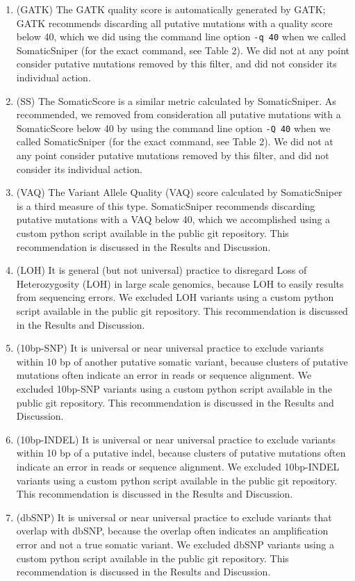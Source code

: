 \documentclass[11pt]{article} %
\begin{document}
\begin{enumerate}
\item (GATK) The GATK quality score is automatically generated by GATK; GATK recommends discarding all putative mutations with a quality score below 40, which we did using the command line option \texttt{-q 40} when we called SomaticSniper (for the exact command, see Table 2). We did not at any point consider putative mutations removed by this filter, and did not consider its individual action. 
\item (SS) The SomaticScore is a similar metric calculated by SomaticSniper. As recommended, we removed from consideration all putative mutations with a SomaticScore below 40 by using the command line option \texttt{-Q 40} when we called SomaticSniper (for the exact command, see Table 2). We did not at any point consider putative mutations removed by this filter, and did not consider its individual action. 
\item (VAQ) The Variant Allele Quality (VAQ) score calculated by SomaticSniper is a third measure of this type. SomaticSniper recommends discarding putative mutations with a VAQ below 40, which we accomplished using a custom python script available in the public git repository. This recommendation is discussed in the Results and Discussion.
\item (LOH) It is general (but not universal) practice to disregard Loss of Heterozygosity (LOH) in large scale genomics, because LOH to easily results from sequencing errors. We excluded LOH variants using a custom python script available in the public git repository. This recommendation is discussed in the Results and Discussion.
\item (10bp-SNP) It is universal or near universal practice to exclude variants within 10 bp of another putative somatic variant, because clusters of putative mutations often indicate an error in reads or sequence alignment. We excluded 10bp-SNP variants using a custom python script available in the public git repository. This recommendation is discussed in the Results and Discussion.
\item (10bp-INDEL) It is universal or near universal practice to exclude variants within 10 bp of a putative indel, because clusters of putative mutations often indicate an error in reads or sequence alignment. We excluded 10bp-INDEL variants using a custom python script available in the public git repository. This recommendation is discussed in the Results and Discussion.
\item (dbSNP) It is universal or near universal practice to exclude variants that overlap with dbSNP, because the overlap often indicates an amplification error and not a true somatic variant. We excluded dbSNP variants using a custom python script available in the public git repository. This recommendation is discussed in the Results and Discussion.

\end{enumerate}
\end{document}
